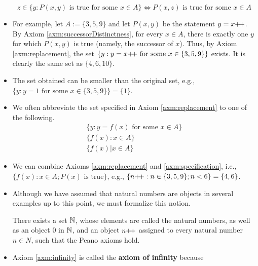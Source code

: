 \documentclass[../main.tex]{subfiles}
\begin{document}
\begin{itemize}
\begin{axm}[Replacement]
        \begin{equation*}
            z\in\{y:P(x,y)\text{ is true for some }x\in A\} \Longleftrightarrow P(x,z)\text{ is true for some }x\in A
        \end{equation*}
    \end{axm}
    \item For example, let $A:=\{3,5,9\}$ and let $P(x,y)$ be the statement $y=x{+\!+}$. By Axiom \ref{axm:successorDistinctness}, for every $x\in A$, there is exactly one $y$ for which $P(x,y)$ is true (namely, the successor of $x$). Thus, by Axiom \ref{axm:replacement}, the set $\{y:y=x{+\!+}\text{ for some }x\in\{3,5,9\}\}$ exists. It is clearly the same set as $\{4,6,10\}$.
    \item The set obtained can be smaller than the original set, e.g., $\{y:y=1\text{ for some }x\in\{3,5,9\}\}=\{1\}$.
    \item We often abbreviate the set specified in Axiom \ref{axm:replacement} to one of the following.
    \begin{gather*}
        \{y:y=f(x)\text{ for some }x\in A\}\\
        \{f(x):x\in A\}\\
        \{f(x)\Big|x\in A\}
    \end{gather*}
    \item We can combine Axioms \ref{axm:replacement} and \ref{axm:specification}, i.e., $\{f(x):x\in A;P(x)\text{ is true}\}$, e.g., $\{n{+\!+}:n\in\{3,5,9\};n<6\}=\{4,6\}$.
    \item Although we have assumed that natural numbers are objects in several examples up to this point, we must formalize this notion.
    \begin{axm}[Infinity]\label{axm:infinity}
        There exists a set $\mathbb{N}$, whose elements are called the natural numbers, as well as an object $0$ in $\mathbb{N}$, and an object $n{+\!+}$ assigned to every natural number $n\in N$, such that the Peano axioms hold.
    \end{axm}
    \item Axiom \ref{axm:infinity} is called the \textbf{axiom of infinity} because 
\end{itemize}
\end{document}
